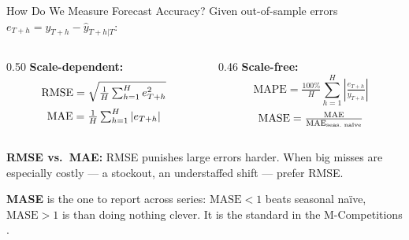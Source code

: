 \documentclass[aspectratio=169, 11pt]{beamer}
\begin{document}
\begin{frame}{How Do We Measure Forecast Accuracy?}
  Given out-of-sample errors $e_{T+h} = y_{T+h} - \hat{y}_{T+h|T}$:
  \begin{columns}[T]
    \begin{column}{0.50\textwidth}
      \textbf{Scale-dependent:}
      \[
        \operatorname{RMSE} = \sqrt{\tfrac{1}{H}\textstyle\sum_{h=1}^{H} e_{T+h}^2}
      \]
      \vspace{-0.35cm}
      \[
        \operatorname{MAE}  = \tfrac{1}{H}\textstyle\sum_{h=1}^{H} |e_{T+h}|
      \]
    \end{column}
    \begin{column}{0.46\textwidth}
      \textbf{Scale-free:}
      \[
        \text{MAPE} = \tfrac{100\%}{H}\textstyle\sum_{h=1}^{H}
                      \left|\tfrac{e_{T+h}}{y_{T+h}}\right|
      \]
      \vspace{-0.35cm}
      \[
        \text{MASE} = \tfrac{\operatorname{MAE}}{\text{MAE}_{\text{seas.\ na\"{i}ve}}}
      \]
    \end{column}
  \end{columns}
  \vspace{0.2cm}
  \textbf{RMSE vs.\ MAE:} RMSE punishes large errors harder. When big misses are
  especially costly --- a stockout, an understaffed shift --- prefer RMSE.

  \vspace{0.1cm}
  \textbf{MASE} is the one to report across series:
  $\text{MASE} < 1$ beats seasonal na\"{i}ve, $\text{MASE} > 1$ is
   than doing nothing clever. It is the standard in the
  M-Competitions \parencite{Makridakis2020}.
\end{frame}
\end{document}
